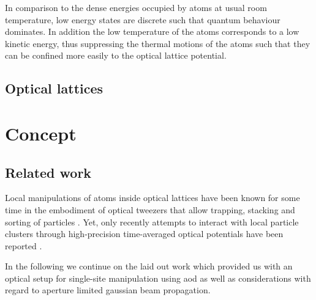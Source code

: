In comparison to the dense energies occupied by atoms at usual room
temperature, low energy states are discrete such that quantum
behaviour dominates. In addition the low temperature of the atoms corresponds
to a low kinetic energy, thus suppressing the thermal motions of the atoms
such that they can be confined more easily to the optical lattice potential.

\subsection{Optical lattices}

\section{Concept}

\subsection{Related work}

Local manipulations of atoms inside optical lattices have been known for some
time in the embodiment of optical tweezers that allow trapping, stacking and
sorting of particles \cite{Tadmor2004}. Yet, only recently attempts to
interact with local particle clusters through high-precision time-averaged
optical potentials have been reported \cite{Roy2016}.

In the following we continue on the laid out work \cite{Hertlein2017} which
provided us with an optical setup for single-site manipulation using
\gls{aod} as well as considerations with regard to aperture limited
gaussian beam propagation.
